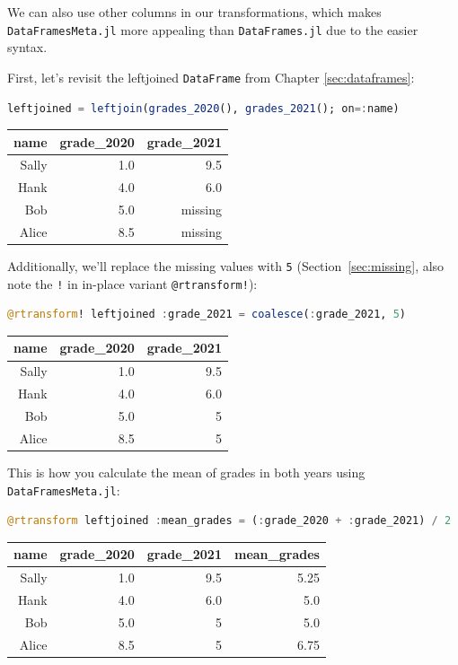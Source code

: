 \documentclass[
  notoc %
]{tufte-book}
\newcommand{\passthrough}[1]{#1}
\begin{document}
We can also use other columns in our transformations, which makes
\passthrough{\lstinline!DataFramesMeta.jl!} more appealing than
\passthrough{\lstinline!DataFrames.jl!} due to the easier syntax.

First, let's revisit the leftjoined \passthrough{\lstinline!DataFrame!}
from Chapter \ref{sec:dataframes}:

\begin{lstlisting}[language=Julia]
leftjoined = leftjoin(grades_2020(), grades_2021(); on=:name)
\end{lstlisting}

\begin{longtable}[]{@{}rrr@{}}
\toprule
name & grade\_2020 & grade\_2021 \\
\midrule
\endhead
Sally & 1.0 & 9.5 \\
Hank & 4.0 & 6.0 \\
Bob & 5.0 & missing \\
Alice & 8.5 & missing \\
\bottomrule
\end{longtable}

Additionally, we'll replace the missing values with
\passthrough{\lstinline!5!} (Section~\ref{sec:missing}, also note the
\passthrough{\lstinline"!"} in in-place variant
\passthrough{\lstinline"@rtransform!"}):

\begin{lstlisting}[language=Julia]
@rtransform! leftjoined :grade_2021 = coalesce(:grade_2021, 5)
\end{lstlisting}

\begin{longtable}[]{@{}rrr@{}}
\toprule
name & grade\_2020 & grade\_2021 \\
\midrule
\endhead
Sally & 1.0 & 9.5 \\
Hank & 4.0 & 6.0 \\
Bob & 5.0 & 5 \\
Alice & 8.5 & 5 \\
\bottomrule
\end{longtable}

This is how you calculate the mean of grades in both years using
\passthrough{\lstinline!DataFramesMeta.jl!}:

\begin{lstlisting}[language=Julia]
@rtransform leftjoined :mean_grades = (:grade_2020 + :grade_2021) / 2
\end{lstlisting}

\begin{longtable}[]{@{}rrrr@{}}
\toprule
name & grade\_2020 & grade\_2021 & mean\_grades \\
\midrule
\endhead
Sally & 1.0 & 9.5 & 5.25 \\
Hank & 4.0 & 6.0 & 5.0 \\
Bob & 5.0 & 5 & 5.0 \\
Alice & 8.5 & 5 & 6.75 \\
\bottomrule
\end{longtable}
\end{document}
